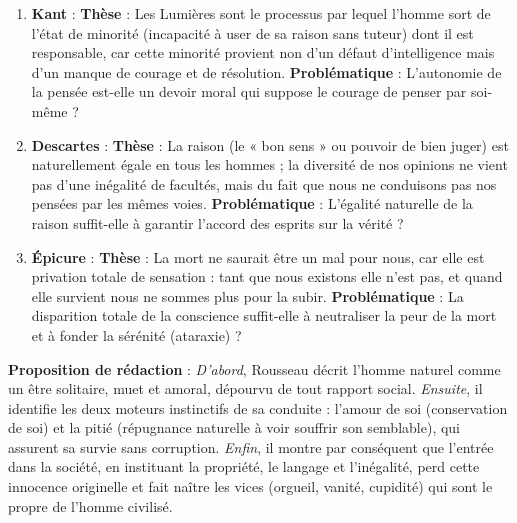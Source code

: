 \documentclass[11pt]{article}
\begin{document}
\begin{corrige}
\begin{enumerate}
\item \textbf{Kant} : \textbf{Thèse} : Les Lumières sont le processus par lequel l'homme sort de l'état de minorité (incapacité à user de sa raison sans tuteur) dont il est responsable, car cette minorité provient non d'un défaut d'intelligence mais d'un manque de courage et de résolution. \textbf{Problématique} : L'autonomie de la pensée est-elle un devoir moral qui suppose le courage de penser par soi-même ?
\item \textbf{Descartes} : \textbf{Thèse} : La raison (le « bon sens » ou pouvoir de bien juger) est naturellement égale en tous les hommes ; la diversité de nos opinions ne vient pas d'une inégalité de facultés, mais du fait que nous ne conduisons pas nos pensées par les mêmes voies. \textbf{Problématique} : L'égalité naturelle de la raison suffit-elle à garantir l'accord des esprits sur la vérité ?
\item \textbf{Épicure} : \textbf{Thèse} : La mort ne saurait être un mal pour nous, car elle est privation totale de sensation : tant que nous existons elle n'est pas, et quand elle survient nous ne sommes plus pour la subir. \textbf{Problématique} : La disparition totale de la conscience suffit-elle à neutraliser la peur de la mort et à fonder la sérénité (ataraxie) ?
\end{enumerate}
\end{corrige}

\begin{corrige}
\textbf{Proposition de rédaction} :
\guillemotleft \emph{D'abord}, Rousseau décrit l'homme naturel comme un être solitaire, muet et amoral, dépourvu de tout rapport social. \emph{Ensuite}, il identifie les deux moteurs instinctifs de sa conduite : l'amour de soi (conservation de soi) et la pitié (répugnance naturelle à voir souffrir son semblable), qui assurent sa survie sans corruption. \emph{Enfin}, il montre par conséquent que l'entrée dans la société, en instituant la propriété, le langage et l'inégalité, perd cette innocence originelle et fait naître les vices (orgueil, vanité, cupidité) qui sont le propre de l'homme civilisé. \guillemotright
\end{corrige}
\end{document}
